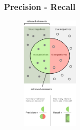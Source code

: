 \begin{frame}
	\frametitle{Precision - Recall}
	\footnotesize
	
	
	\begin{figure}
		\includegraphics[width=0.25\textwidth]{./images/precision_recall.pdf}
	\end{figure}
\end{frame}


